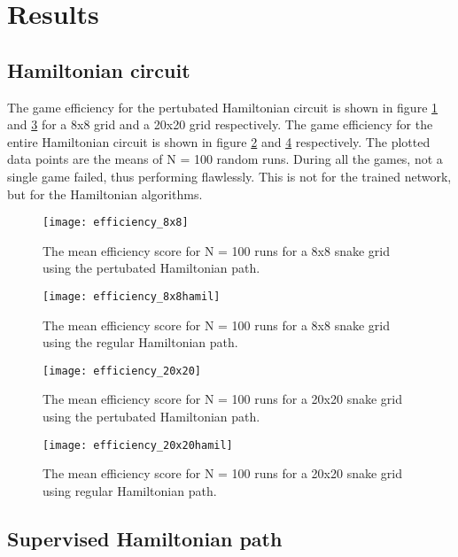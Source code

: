 \documentclass[%
 uio,
 jmp,
 amsmath,amssymb,
 reprint, nofootinbib]{revtex4-1}
\numberwithin{equation}{section}
\begin{document}
\section{Results}\label{sec:Results}

\subsection{Hamiltonian circuit}

The game efficiency for the pertubated Hamiltonian circuit is shown in figure \ref{fig:01} and \ref{fig:03} for a 8x8 grid and a 20x20 grid respectively. The game efficiency for the entire Hamiltonian circuit is shown in figure \ref{fig:02} and \ref{fig:04} respectively. The plotted data points are the means of N = 100 random runs. During all the games, not a single game failed, thus performing flawlessly. This is not for the trained network, but for the Hamiltonian algorithms.


\begin{figure}[H]
    \centering
    \texttt{[image: efficiency\_8x8]}
    \caption{The mean efficiency score for N = 100 runs for a 8x8 snake grid using the pertubated Hamiltonian path.}
    \label{fig:01}
\end{figure}

\begin{figure}[H]
    \centering
    \texttt{[image: efficiency\_8x8hamil]}
    \caption{The mean efficiency score for N = 100 runs for a 8x8 snake grid using the regular Hamiltonian path.}
    \label{fig:02}
\end{figure}

\begin{figure}[H]
    \centering
    \texttt{[image: efficiency\_20x20]}
    \caption{The mean efficiency score for N = 100 runs for a 20x20 snake grid using the pertubated Hamiltonian path.}
    \label{fig:03}
\end{figure}

\begin{figure}[H]
    \centering
    \texttt{[image: efficiency\_20x20hamil]}
    \caption{The mean efficiency score for N = 100 runs for a 20x20 snake grid using regular Hamiltonian path.}
    \label{fig:04}
\end{figure}

\subsection{Supervised Hamiltonian path}
\end{document}
